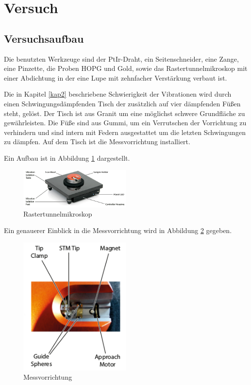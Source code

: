 \section{Versuch}
\subsection{Versuchsaufbau}
Die benutzten Werkzeuge sind der PtIr-Draht, ein Seitenschneider, eine Zange, eine Pinzette, die Proben HOPG und Gold, sowie das Rastertunnelmikroskop mit einer Abdichtung in der eine Lupe mit zehnfacher Verstärkung verbaut ist.

\noindent Die in Kapitel \ref{kap2} beschriebene Schwierigkeit der Vibrationen wird durch einen Schwingungsdämpfenden Tisch der zusätzlich auf vier dämpfenden Füßen steht, gelöst. Der Tisch ist aus Granit um eine möglichst schwere Grundfläche zu gewährleisten. Die Füße sind aus Gummi, um ein Verrutschen der Vorrichtung zu verhindern und sind intern mit Federn ausgestattet um die letzten Schwingungen zu dämpfen. Auf dem Tisch ist die Messvorrichtung installiert.

\noindent Ein Aufbau ist in Abbildung \ref{fig:Aufbau1} \cite{handbuch} dargestellt. 

\begin{figure}
	\centering
		\includegraphics[width=0.5\textwidth]{Aufbau1.png}
	\caption{Rastertunnelmikroskop}
	\label{fig:Aufbau1}
\end{figure}

\noindent Ein genauerer Einblick in die Messvorrichtung wird in Abbildung \ref{fig:Aufbau2} gegeben.

\begin{figure}
	\centering
		\includegraphics[width=0.5\textwidth]{Aufbau2.png}
	\caption{Messvorrichtung}
	\label{fig:Aufbau2}
\end{figure}

